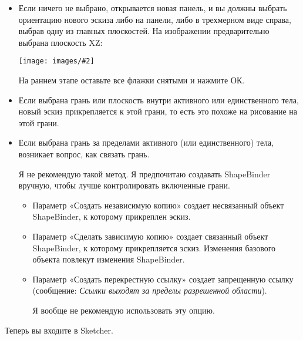 \documentclass[12pt,titlepage]{article}
\newcommand{\img}[2]{\vspace{2ex}\noindent\texttt{[image: images/\#2]}}
\begin{document}
\begin{itemize}
\item Если ничего не выбрано, открывается новая панель, и вы должны выбрать ориентацию нового эскиза либо на панели, либо в трехмерном виде справа, выбрав одну из главных плоскостей. На изображении предварительно выбрана плоскость XZ:

\img{width=0.45\textwidth}{Origin}

На раннем этапе оставьте все флажки снятыми и нажмите ОК.
\item Если выбрана грань или плоскость внутри активного или единственного тела, новый эскиз прикрепляется к этой грани, то есть это похоже на рисование на этой грани. 
\item Если выбрана грань за пределами активного (или единственного) тела, возникает вопрос, как связать грань.

      Я не рекомендую такой метод. Я предпочитаю создавать ShapeBinder вручную, чтобы лучше контролировать включенные грани.
      \begin{itemize}
      \item Параметр «Создать независимую копию» создает несвязанный объект ShapeBinder, к которому прикреплен эскиз.
      \item Параметр «Сделать зависимую копию» создает связанный объект ShapeBinder, к которому прикрепляется эскиз. Изменения базового объекта повлекут изменения ShapeBinder.
      \item Параметр «Создать перекрестную ссылку» создает запрещенную ссылку (сообщение: {\em Ссылки выходят за пределы разрешенной области}).

            Я вообще не рекомендую использовать эту опцию.
      \end{itemize}
\end{itemize}

Теперь вы входите в Sketcher.
\end{document}
